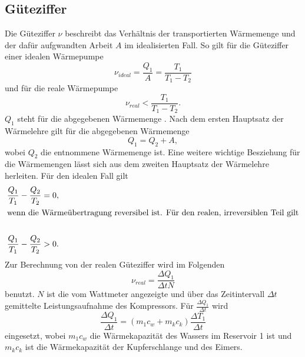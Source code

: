 \subsection{Güteziffer} %
\label{sub:Güteziffer}
Die Güteziffer $\nu$ beschreibt das Verhältnis der transportierten Wärmemenge und der dafür aufgwandten Arbeit $A$ im idealisierten Fall.
So gilt für die Güteziffer einer idealen Wärmepumpe
\begin{equation*}
    \nu_{ideal} = \frac{Q_1}{A} = \frac{T_1}{T_1 - T_2}
\end{equation*} 
und für die reale Wärmepumpe
\begin{equation*}
    \nu_{real} < \frac{T_1}{T_1 - T_2}.
\end{equation*}
$Q_1$ steht für die abgegebenen Wärmemenge . 
Nach dem ersten Hauptsatz der Wärmelehre gilt für die abgegebenen Wärmemenge
\begin{equation*}
    Q_1 = Q_2 + A ,
\end{equation*}
wobei $Q_2$  die entnommene Wärmemenge ist.
Eine weitere wichtige Besziehung für die Wärmemengen lässt sich aus dem zweiten Hauptsatz der Wärmelehre herleiten.
Für den idealen Fall gilt
\begin{align*}
    \frac{Q_1}{T_1}-\frac{Q_2}{T_2} = 0,\\
    \intertext{wenn die Wärmeübertragung reversibel ist. Für den realen, irreversiblen Teil gilt}\\
    \frac{Q_1}{T_1}-\frac{Q_2}{T_2} > 0.
\end{align*}
Zur Berechnung von der realen Güteziffer wird im Folgenden 
\begin{equation}
    \nu_{real} = \frac{\Delta Q_1}{\Delta t N}
    \label{eqn:Güteziffer}
\end{equation}
benutzt. 
$N$ ist die vom Wattmeter angezeigte und über das Zeitintervall $\Delta t$ gemittelte Leistungsaufnahme des Kompressors.
Für $\frac{\Delta Q_1}{\Delta t}$ wird
\begin{equation}
    \frac{\Delta Q_1}{\Delta t} = (m_1 c_w + m_k c_k)\frac{\Delta T_1}{\Delta t}
    \label{eqn:DeltaQ1}
\end{equation}
eingesetzt, wobei $m_1 c_w$ die Wärmekapazität des Wassers im Reservoir 1 ist und $m_k c_k$ ist die Wärmekapazität der Kupferschlange und des Eimers.
